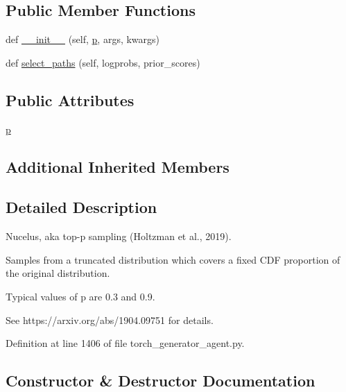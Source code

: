 \subsection*{Public Member Functions}
\begin{DoxyCompactItemize}
\item 
def \hyperlink{classparlai_1_1core_1_1torch__generator__agent_1_1NucleusSampling_a90c444c7fa1f76baac3a54fc7c980e15}{\+\_\+\+\_\+init\+\_\+\+\_\+} (self, \hyperlink{classparlai_1_1core_1_1torch__generator__agent_1_1NucleusSampling_a54a43b58e2e2cf7da776c40311e0a3c1}{p}, args, kwargs)
\item 
def \hyperlink{classparlai_1_1core_1_1torch__generator__agent_1_1NucleusSampling_a91abde2fb2dccf5cd0564825ddc5ea4d}{select\+\_\+paths} (self, logprobs, prior\+\_\+scores)
\end{DoxyCompactItemize}
\subsection*{Public Attributes}
\begin{DoxyCompactItemize}
\item 
\hyperlink{classparlai_1_1core_1_1torch__generator__agent_1_1NucleusSampling_a54a43b58e2e2cf7da776c40311e0a3c1}{p}
\end{DoxyCompactItemize}
\subsection*{Additional Inherited Members}


\subsection{Detailed Description}
\begin{DoxyVerb}Nucelus, aka top-p sampling (Holtzman et al., 2019).

Samples from a truncated distribution which covers a fixed CDF proportion
of the original distribution.

Typical values of p are 0.3 and 0.9.

See https://arxiv.org/abs/1904.09751 for details.
\end{DoxyVerb}
 

Definition at line 1406 of file torch\+\_\+generator\+\_\+agent.\+py.



\subsection{Constructor \& Destructor Documentation}
\mbox{\label{classparlai_1_1core_1_1torch__generator__agent_1_1NucleusSampling_a90c444c7fa1f76baac3a54fc7c980e15}} 
